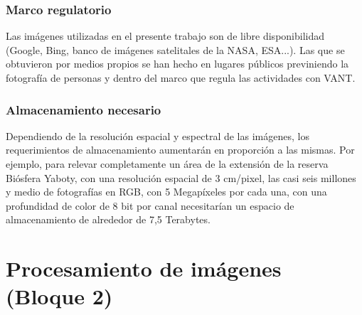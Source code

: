 \subsubsection{Marco regulatorio} %
Las imágenes utilizadas en el presente trabajo son de libre disponibilidad (Google, Bing, banco de imágenes satelitales de la NASA, ESA...). Las que se obtuvieron por medios propios se han hecho en lugares públicos previniendo la fotografía de personas y dentro del marco que regula las actividades con VANT. 
\subsubsection{Almacenamiento necesario} %
Dependiendo de la resolución espacial y espectral de las imágenes, los requerimientos de almacenamiento aumentarán en proporción a las mismas. Por ejemplo, para relevar completamente un área de la extensión de la reserva Biósfera Yaboty, con una resolución espacial de 3 cm/pixel, las casi seis millones y medio de fotografías en RGB, con 5 Megapíxeles por cada una, con una profundidad de color de 8 bit por canal necesitarían un espacio de almacenamiento de alrededor de 7,5 Terabytes.

\section{Procesamiento de imágenes (Bloque 2)} \label{Metodo bloque 2}


